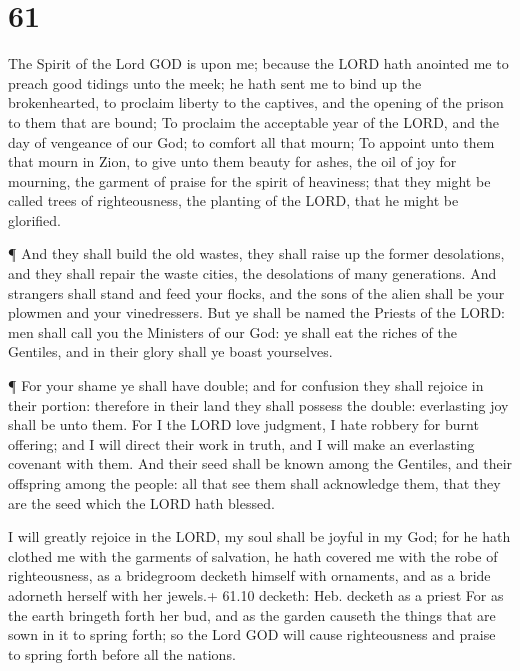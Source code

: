\hypertarget{section-60}{%
\section{61}\label{section-60}}

 The Spirit of the Lord GOD is upon me; because the LORD
hath anointed me to preach good tidings unto the meek; he hath sent me
to bind up the brokenhearted, to proclaim liberty to the captives, and
the opening of the prison to them that are bound;  To
proclaim the acceptable year of the LORD, and the day of vengeance of
our God; to comfort all that mourn;  To appoint unto them
that mourn in Zion, to give unto them beauty for ashes, the oil of joy
for mourning, the garment of praise for the spirit of heaviness; that
they might be called trees of righteousness, the planting of the LORD,
that he might be glorified.

 ¶ And they shall build the old wastes, they shall raise up
the former desolations, and they shall repair the waste cities, the
desolations of many generations.  And strangers shall stand
and feed your flocks, and the sons of the alien shall be your plowmen
and your vinedressers.  But ye shall be named the Priests of
the LORD: men shall call you the Ministers of our God: ye shall eat the
riches of the Gentiles, and in their glory shall ye boast yourselves.

 ¶ For your shame ye shall have double; and for confusion
they shall rejoice in their portion: therefore in their land they shall
possess the double: everlasting joy shall be unto them.  For
I the LORD love judgment, I hate robbery for burnt offering; and I will
direct their work in truth, and I will make an everlasting covenant with
them.  And their seed shall be known among the Gentiles, and
their offspring among the people: all that see them shall acknowledge
them, that they are the seed which the LORD hath blessed.

 I will greatly rejoice in the LORD, my soul shall be
joyful in my God; for he hath clothed me with the garments of salvation,
he hath covered me with the robe of righteousness, as a bridegroom
decketh himself with ornaments, and as a bride adorneth herself with her
jewels.+ 61.10 decketh: Heb. decketh as a priest  For as
the earth bringeth forth her bud, and as the garden causeth the things
that are sown in it to spring forth; so the Lord GOD will cause
righteousness and praise to spring forth before all the nations.

